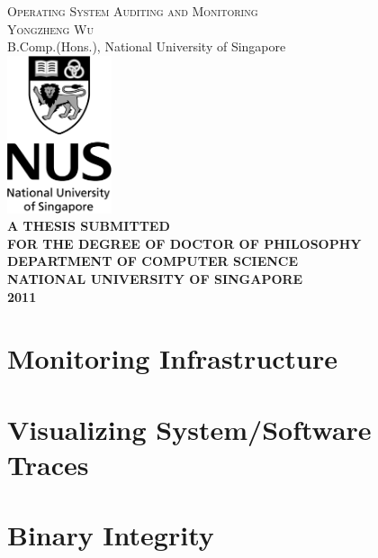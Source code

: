 \documentclass[11pt,a4paper,openany]{book}
\begin{document}
\begin{titlepage}
\begin{center}
\textsc{\Huge Operating System Auditing and Monitoring} \\
\vspace{2cm}
\textsc{\huge Yongzheng Wu} \\
{B.Comp.(Hons.), National University of Singapore} \\
\vspace{3cm}
\includegraphics[width=0.23\textwidth]{nus-logo.png} \\
\vspace{5cm}
{\large\bf
A THESIS SUBMITTED \\
\vspace{0.5cm}
FOR THE DEGREE OF DOCTOR OF PHILOSOPHY \\
DEPARTMENT OF COMPUTER SCIENCE \\
NATIONAL UNIVERSITY OF SINGAPORE \\
\vspace{1cm}
2011}
\end{center}
\end{titlepage}

\thispagestyle{empty}

\frontmatter

\tableofcontents

\listoftables
\listoffigures

\mainmatter


  
  
\chapter{Monitoring Infrastructure} \label{sec:mon}
  
  
  

\chapter{Visualizing System/Software Traces} \label{sec:vis}
  
  
  
\chapter{Binary Integrity} \label{sec:auth}
  
  
  


\backmatter


\end{document}
